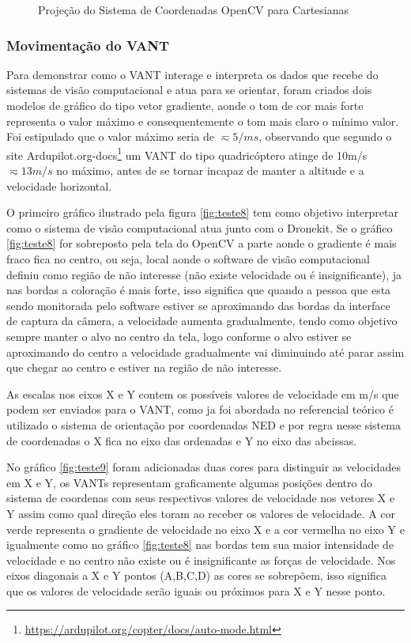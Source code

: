 \begin{figure}[H]
	\centering
	\caption{Projeção do Sistema de Coordenadas OpenCV para Cartesianas}
	
	\label{fig:conv}
\end{figure}

\subsubsection{Movimentação do VANT}

Para demonstrar como o VANT interage e interpreta os dados que recebe do sistemas de visão computacional e atua para se orientar, foram criados dois modelos de gráfico do tipo vetor gradiente, aonde o tom de cor mais forte representa o valor máximo e consequentemente o tom mais claro o mínimo valor. Foi estipulado que o valor máximo seria de $\displaystyle \eqsim 5/ms$, observando que segundo o site Ardupilot.org-docs\footnote{\url{https://ardupilot.org/copter/docs/auto-mode.html}} um VANT do tipo quadricóptero atinge de 10m/s $\displaystyle \eqsim13m/s$ no máximo, antes de se tornar incapaz de manter a altitude e a velocidade horizontal. 

O primeiro gráfico ilustrado pela figura \ref{fig:teste8} tem como objetivo interpretar como o sistema de visão computacional atua junto com o Dronekit. Se o gráfico \ref{fig:teste8} for sobreposto pela tela do OpenCV a parte aonde o gradiente é mais fraco fica no centro, ou seja, local aonde o software de visão computacional definiu como região de não interesse (não existe velocidade ou é insignificante), ja nas bordas a coloração é mais forte, isso significa que quando a pessoa que esta sendo monitorada pelo software estiver se aproximando  das bordas da interface de captura da câmera, a velocidade aumenta gradualmente, tendo como objetivo sempre manter o alvo no centro da tela, logo conforme o alvo estiver se aproximando do centro a velocidade gradualmente vai diminuindo até parar assim que chegar ao centro e estiver na região de não interesse.

As escalas nos eixos X e Y contem os possíveis valores de velocidade em m/s que podem ser enviados para o VANT, como ja foi abordada no referencial teórico é utilizado o sistema de orientação por coordenadas NED e por regra nesse sistema de coordenadas o X fica no eixo das ordenadas e Y no eixo das abcissas.

No gráfico \ref{fig:teste9} foram adicionadas duas cores para distinguir as velocidades em X e Y, os VANTs representam graficamente algumas posições dentro do sistema de coordenas com seus respectivos valores de velocidade nos vetores X e Y assim como qual direção eles toram ao receber os valores de velocidade. A cor verde representa o gradiente de velocidade no eixo X e a cor vermelha no eixo Y e igualmente como no gráfico \ref{fig:teste8} nas bordas tem sua maior intensidade de velocidade e no centro não existe ou é insignificante as forças de velocidade. Nos eixos diagonais a X e Y pontos (A,B,C,D) as cores se sobrepõem, isso significa que os valores de velocidade serão iguais ou próximos para X e Y nesse ponto.

